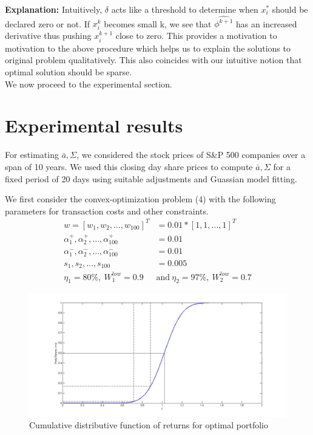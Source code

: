 \documentclass[a4paper]{article}
\begin{document}
\textbf{Explanation:} Intuitively, $\delta$ acts like a threshold to determine when $x_i^*$ should be declared zero or not. If $x_i^k$ becomes small k, we see that $\hat{\phi^{k+1}}$ has an increased derivative thus pushing $x_i^{k+1}$ close to zero. This provides a motivation to motivation to the above procedure which helps us to explain the solutions to original problem qualitatively. This also coincides with our intuitive notion that optimal solution should be sparse.\\[0.2em]

We now proceed to the experimental section.

\section{Experimental results}

For estimating $\bar{a},\Sigma$, we considered the stock prices of S\&P 500 companies over a span of 10 years. We used this closing day share prices to compute $\bar{a},\Sigma$ for a fixed period of 20 days using suitable adjustments and Guassian model fitting. 


We first consider the convex-optimization problem (4) with the following parameters for transaction costs and other constraints.
\begin{align*}
w=[w_1,w_2,\ldots,w_{100}]^T&=0.01*[1,1,\ldots,1]^T\\
\alpha_1^+,\alpha_2^+,\ldots,\alpha_{100}^+ &=0.01\\
\alpha_1^-,\alpha_2^-,\ldots,\alpha_{100}^- &= 0.01\\
s_1,s_2,\ldots,s_{100} &=0.005\\
\eta_1 = 80 \%,\  W_1^{low}=0.9 \  &\text{and} \ \eta_2 = 97\%,\  W_2^{low} =0.7
\end{align*}


\begin{figure}[h]
\centering
\includegraphics[width=6in]{kaavali.jpg}
\caption{Cumulative distributive function of returns for optimal portfolio}
\label{fig:1}
\end{figure}
\end{document}
